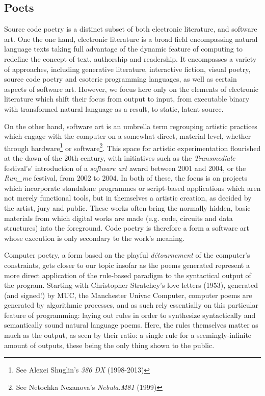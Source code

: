 \pagebreak

\subsection{Poets}

Source code poetry is a distinct subset of both electronic literature, and software art.  One the one hand, electronic literature is a broad field encompassing natural language texts taking full advantage of the dynamic feature of computing to redefine the concept of text, authorship and readership. It encompasses a variety of approaches, including generative literature, interactive fiction, visual poetry, source code poetry and esoteric programming languages, as well as certain aspects of software art. However, we focus here only on the elements of electronic literature which shift their focus from output to input, from executable binary with transformed natural language as a result, to static, latent source.

On the other hand, software art is an umbrella term regrouping artistic practices which engage with the computer on a somewhat direct, material level, whether through hardware\footnote{See Alexei Shuglin's \emph{386 DX} (1998-2013)} or software\footnote{See Netochka Nezanova's \emph{Nebula.M81} (1999)}. This space for artistic experimentation flourished at the dawn of the 20th century, with initiatives such as the \emph{Transmediale} festival's' introduction of a \emph{software art} award between 2001 and 2004, or the \emph{Run\_me} festival, from 2002 to 2004. In both of these, the focus is on projects which incorporate standalone programmes or script-based applications which aren not merely functional tools, but in themselves a artistic creation, as decided by the artist, jury and public. These works often bring the normally hidden, basic materials from which digital works are made (e.g. code, circuits and data structures) into the foreground\cite{yuill_code_2004}. Code poetry is therefore a form a software art whose execution is only secondary to the work's meaning.

Computer poetry, a form based on the playful \emph{détournement} of the computer's constraints, gets closer to our topic insofar as the poems generated represent a more direct application of the rule-based paradigm to the syntactical output of the program. Starting with Christopher Stratchey's love letters (1953), generated (and signed!) by MUC, the Manchester Univac Computer, computer poems are generated by algorithmic processes, and as such rely essentially on this particular feature of programming: laying out rules in order to synthesize syntactically and semantically sound natural language poems. Here, the rules themselves matter as much as the output, as seen by their ratio: a single rule for a seemingly-infinite amount of outputs, these being the only thing shown to the public.

